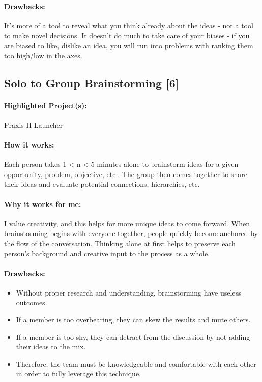 \documentclass[a4paper,12pt]{article}
\begin{document}
\paragraph{Drawbacks: }
It’s more of a tool to reveal what you think already about the ideas - not a tool to make novel decisions. It doesn’t do much to take care of your biases - if you are biased to {like, dislike} an idea, you will run into problems with ranking them too high/low in the axes.

\subsection{Solo to Group Brainstorming [6]}
\label{sec:solo}
\paragraph{Highlighted Project(s): } Praxis II Launcher
\paragraph{How it works: } 
Each person takes 1 < n < 5 minutes alone to brainstorm ideas for a given {opportunity, problem, objective, etc.}. The group then comes together to share their ideas and evaluate potential {connections, hierarchies, etc.}

\paragraph{Why it works for me: }
I value creativity, and this helps for more unique ideas to come forward. When brainstorming begins with everyone together, people quickly become anchored by the flow of the conversation. Thinking alone at first helps to preserve each person’s background and creative input to the process as a whole.


\paragraph{Drawbacks: }
\begin{itemize}
	\item Without proper research and understanding, brainstorming have useless outcomes.
	\item If a member is too overbearing, they can skew the results and mute others.
	\item If a member is too shy, they can detract from the discussion by not adding their ideas to the mix.
	\item Therefore, the team must be knowledgeable and comfortable with each other in order to fully leverage this technique.
\end{itemize}
\end{document}
